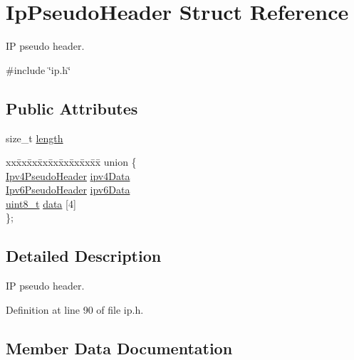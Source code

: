 \hypertarget{structIpPseudoHeader}{}\section{Ip\+Pseudo\+Header Struct Reference}
\label{structIpPseudoHeader}


IP pseudo header.  




{\ttfamily \#include \char`\"{}ip.\+h\char`\"{}}

\subsection*{Public Attributes}
\begin{DoxyCompactItemize}
\item 
size\+\_\+t \hyperlink{structIpPseudoHeader_aeff06b8d9c3e7e2ef3cdb8a3a14e8ad2}{length}
\item 
\begin{tabbing}
xx\=xx\=xx\=xx\=xx\=xx\=xx\=xx\=xx\=\kill
union \{\\
\>\hyperlink{ipv4_8h_a0e92b64e038199f1bb6383f2a76f30b6}{Ipv4PseudoHeader} \hyperlink{structIpPseudoHeader_a4dd0d91580f30918dc7b5d5a430dba6a}{ipv4Data}\\
\>\hyperlink{ipv6_8h_a68061e0a0b502d880cbe60b645cfa2b7}{Ipv6PseudoHeader} \hyperlink{structIpPseudoHeader_a5155846ca7e85218407a8374d035aab7}{ipv6Data}\\
\>\hyperlink{stdint_8h_aba7bc1797add20fe3efdf37ced1182c5}{uint8\_t} \hyperlink{structIpPseudoHeader_a87fecad80b6124a9af4a955525f1d39d}{data} \mbox{[}4\mbox{]}\\
\}; \\

\end{tabbing}\end{DoxyCompactItemize}


\subsection{Detailed Description}
IP pseudo header. 

Definition at line 90 of file ip.\+h.



\subsection{Member Data Documentation}
\mbox{\label{structIpPseudoHeader_ace72cbee1fa9c2ec1ca628c68d04b03a}} 
